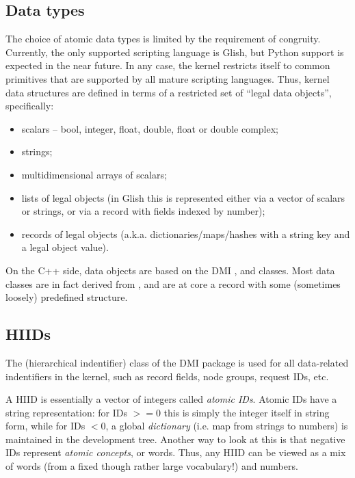 \subsection{Data types}
  
  The choice of atomic data types is limited by the requirement of congruity.
  Currently, the only supported scripting language is Glish, but Python 
  support is expected in the near future. In any case, the kernel  restricts
  itself to common primitives that are supported by all mature scripting
  languages. Thus, kernel data structures are defined in terms of a restricted
  set of ``legal data objects'', specifically:

  \begin{itemize}
  
  \item scalars -- bool, integer, float, double, float or double complex;
  
  \item strings;
  
  \item multidimensional arrays of scalars;
  
  \item lists of legal objects (in Glish this is represented either  via a
  vector of scalars or strings, or via a record with fields indexed by number);

  \item records of legal objects (a.k.a. dictionaries/maps/hashes with a string
  key and a legal object value).

  \end{itemize}

  On the C++ side, data objects are based on the DMI ,
   and  classes. Most data classes are in fact
  derived from , and are at core a record with some (sometimes
  loosely) predefined structure.

\subsection{HIIDs}

  The  (hierarchical indentifier) class of the DMI package is used for
  all data-related indentifiers in the kernel, such as record fields, node
  groups, request IDs, etc.
  
  A HIID is essentially a vector of integers called {\em atomic IDs}. Atomic
  IDs have a string representation: for IDs $>=$0 this is simply the integer
  itself in string form, while for IDs $<$0, a global {\em dictionary} (i.e.
  map from strings to numbers) is maintained in the development tree. Another
  way to look at this is that negative IDs represent {\em atomic concepts}, or
  words. Thus, any HIID can be viewed as a mix of words (from a fixed though
  rather large vocabulary!) and numbers.

